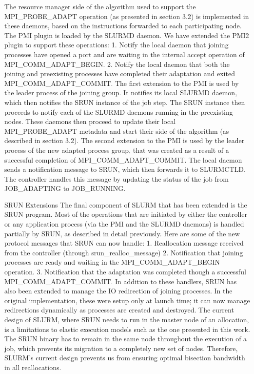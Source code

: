 The resource manager side of the algorithm used to support the MPI{\_}PROBE{\_}ADAPT operation (as presented in section 3.2) is implemented in these daemons, based on the instructions forwarded to each participating node. The PMI plugin is loaded by the SLURMD daemon. We have extended the PMI2 plugin to support these operations:
1. Notify the local daemon that joining processes have opened a port and are waiting in the internal accept operation of MPI{\_}COMM{\_}ADAPT{\_}BEGIN.
2. Notify the local daemon that both the joining and preexisting processes have completed their adaptation and exited MPI{\_}COMM{\_}ADAPT{\_}COMMIT.
The first extension to the PMI is used by the leader process of the joining group. It notifies its local SLURMD daemon, which then notifies the SRUN instance of the job step. The SRUN instance then proceeds to notify each of the SLURMD daemons running in the preexisting nodes. These daemons then proceed to update their local MPI{\_}PROBE{\_}ADAPT metadata and start their side of the algorithm (as described in section 3.2).
The second extension to the PMI is used by the leader process of the new adapted process group, that was created as a result of a successful completion of MPI{\_}COMM{\_}ADAPT{\_}COMMIT. The local daemon sends a notification message to SRUN, which then forwards it to SLURMCTLD. The controller handles this message by updating the status of the job from JOB{\_}ADAPTING to JOB{\_}RUNNING.

SRUN Extensions
The final component of SLURM that has been extended is the SRUN program. Most of the operations that are initiated by either the controller or any application process (via the PMI and the SLURMD daemons) is handled partially by SRUN, as described in detail previously. Here are some of the new protocol messages that SRUN can now handle:
1. Reallocation message received from the controller (through srun{\_}realloc{\_}message)
2. Notification that joining processes are ready and waiting in the MPI{\_}COMM{\_}ADAPT{\_}BEGIN operation.
3. Notification that the adaptation was completed though a successful MPI{\_}COMM{\_}ADAPT{\_}COMMIT.
In addition to these handlers, SRUN has also been extended to manage the IO redirection of joining processes. In the original implementation, these were setup only at launch time; it can now manage redirections dynamically as processes are created and destroyed. The current design of SLURM, where SRUN needs to run in the master node of an allocation, is a limitations to elastic execution models such as the one presented in this work. The SRUN binary has to remain in the same node throughout the execution of a job, which prevents its migration to a completely new set of nodes. Therefore, SLURM's current design prevents us from ensuring optimal bisection bandwidth in all reallocations.
